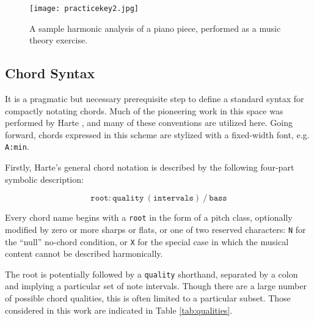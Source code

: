 \begin{figure}[t]
\centering
\texttt{[image: practicekey2.jpg]}
\caption{A sample harmonic analysis of a piano piece, performed as a music theory exercise.}
\label{fig:mthomework}
\end{figure}


\subsection{Chord Syntax}
\label{sec:chord_syntax}

It is a pragmatic but necessary prerequisite step to define a standard syntax for compactly notating chords.
Much of the pioneering work in this space was performed by Harte \cite{Harte2010}, and many of these conventions are utilized here.
Going forward, chords expressed in this scheme are stylized with a fixed-width font, e.g. \texttt{A:min}.

Firstly, Harte's general chord notation is described by the following four-part symbolic description:

\begin{equation}
\texttt{root}:\texttt{quality}~(\texttt{intervals})~/~\texttt{bass}
\end{equation}

\noindent Every chord name begins with a \texttt{root} in the form of a pitch class, optionally modified by zero or more sharps or flats, or one of two reserved characters: \texttt{N} for the ``null'' no-chord condition, or \texttt{X} for the special case in which the musical content cannot be described harmonically.

The root is potentially followed by a \texttt{quality} shorthand, separated by a colon and implying a particular set of note intervals.
Though there are a large number of possible chord qualities, this is often limited to a particular subset.
Those considered in this work are indicated in Table \ref{tab:qualities}.

